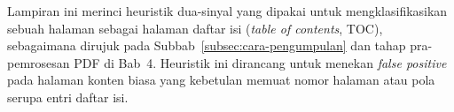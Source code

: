 \documentclass[../../thesis]{subfiles}
\begin{document}
\ifSubfilesClassLoaded{}{\appendix}

\label{lamp:heuristik-toc}

Lampiran ini merinci heuristik dua-sinyal yang dipakai untuk mengklasifikasikan
sebuah halaman sebagai halaman daftar isi (\textit{table of contents}, TOC),
sebagaimana dirujuk pada Subbab~\ref{subsec:cara-pengumpulan} dan tahap
pra-pemrosesan PDF di Bab~4. Heuristik ini dirancang untuk menekan
\textit{false positive} pada halaman konten biasa yang kebetulan memuat nomor
halaman atau pola serupa entri daftar isi.

\end{document}
